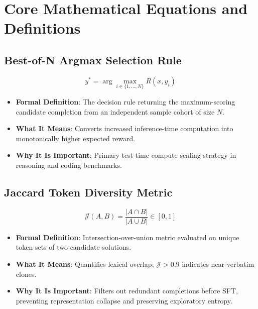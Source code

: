\documentclass[11pt,a4paper]{article}
\theoremstyle{definition}
\begin{document}
\section{Core Mathematical Equations and Definitions}

\subsection{Best-of-N Argmax Selection Rule}
{\boldmath
\begin{equation}
y^* = \arg\max_{i \in \{1, \dots, N\}} R(x, y_i)
\end{equation}
}
\begin{itemize}
    \item \textbf{Formal Definition}: The decision rule returning the maximum-scoring candidate completion from an independent sample cohort of size $N$.
    \item \textbf{What It Means}: Converts increased inference-time computation into monotonically higher expected reward.
    \item \textbf{Why It Is Important}: Primary test-time compute scaling strategy in reasoning and coding benchmarks.
\end{itemize}

\subsection{Jaccard Token Diversity Metric}
{\boldmath
\begin{equation}
\mathcal{J}(A, B) = \frac{|A \cap B|}{|A \cup B|} \in [0, 1]
\end{equation}
}
\begin{itemize}
    \item \textbf{Formal Definition}: Intersection-over-union metric evaluated on unique token sets of two candidate solutions.
    \item \textbf{What It Means}: Quantifies lexical overlap; $\mathcal{J} > 0.9$ indicates near-verbatim clones.
    \item \textbf{Why It Is Important}: Filters out redundant completions before SFT, preventing representation collapse and preserving exploratory entropy.
\end{itemize}
\end{document}
